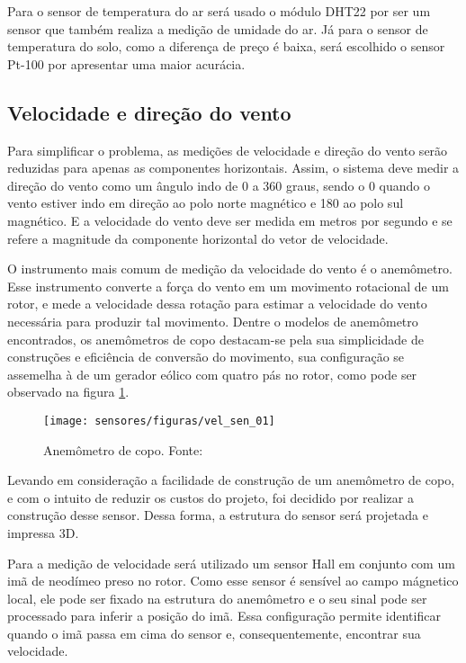 \begin{itemize}
\begin{itemize}
		\end{itemize}

	Para o sensor de temperatura do ar será usado o módulo DHT22 por ser um sensor que também realiza a medição de umidade do ar. Já para o sensor de temperatura do solo, como a diferença de preço é baixa, será escolhido o sensor Pt-100 por apresentar uma maior acurácia.

\end{itemize}

	\subsection{Velocidade e direção do vento}

	Para simplificar o problema, as medições de velocidade e direção do vento serão reduzidas para apenas as componentes horizontais. Assim, o sistema deve medir a direção do vento como um ângulo indo de 0 a 360 graus, sendo o 0 quando o vento estiver indo em direção ao polo norte magnético e 180 ao polo sul magnético. E a velocidade do vento deve ser medida em metros por segundo e se refere a magnitude da componente horizontal do vetor de velocidade.

	O instrumento mais comum de medição da velocidade do vento é o anemômetro. Esse instrumento converte a força do vento em um movimento rotacional de um rotor, e mede a velocidade dessa rotação para estimar a velocidade do vento necessária para produzir tal movimento. Dentre o modelos de anemômetro encontrados, os anemômetros de copo destacam-se pela sua simplicidade de construções e eficiência de conversão do movimento, sua configuração se assemelha à de um gerador eólico com quatro pás no rotor, como pode ser observado na figura \ref{vel_sen_01}.
	
	\begin{figure}[H]
		\centering
		\texttt{[image: sensores/figuras/vel\_sen\_01]}
		\caption{Anemômetro de copo. Fonte: \cite{bib_vel_sen_01}}
		\label{vel_sen_01}
	\end{figure}	 		

	Levando em consideração a facilidade de construção de um anemômetro de copo, e com o intuito de reduzir os custos do projeto, foi decidido por realizar a construção desse sensor. Dessa forma, a estrutura do sensor será projetada e impressa 3D. 
	
	Para a medição de velocidade será utilizado um sensor Hall em conjunto com um imã de neodímeo preso no rotor. Como esse sensor é sensível ao campo mágnetico local, ele pode ser fixado na estrutura do anemômetro e o seu sinal pode ser processado para inferir a posição do imã. Essa configuração permite identificar quando o imã passa em cima do sensor e, consequentemente, encontrar sua velocidade. 
	
